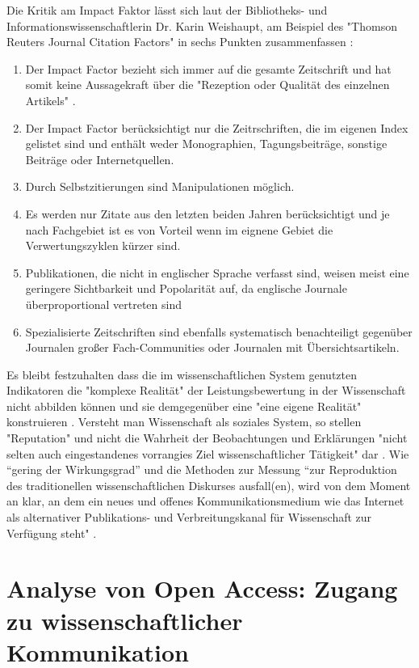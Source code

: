 Die Kritik am Impact Faktor lässt sich laut der Bibliotheks- und Informationswissenschaftlerin Dr. Karin Weishaupt, am Beispiel des "Thomson Reuters Journal Citation Factors" in sechs Punkten zusammenfassen \cite{weishaupt_2009_goldenOA}:
\begin{enumerate}
\item Der Impact Factor bezieht sich immer auf die gesamte Zeitschrift und hat somit keine Aussagekraft über die "Rezeption oder Qualität des einzelnen Artikels" .
\item Der Impact Factor berücksichtigt nur die Zeitrschriften, die im eigenen Index gelistet sind und enthält weder Monographien, Tagungsbeiträge, sonstige Beiträge oder Internetquellen.
\item Durch Selbstzitierungen sind Manipulationen möglich.
\item Es werden nur Zitate aus den letzten beiden Jahren berücksichtigt und je nach Fachgebiet ist es von Vorteil wenn im eignene Gebiet die Verwertungszyklen kürzer sind.
\item Publikationen, die nicht in englischer Sprache verfasst sind, weisen meist eine geringere Sichtbarkeit und Popolarität auf, da englische Journale überproportional vertreten sind
\item Spezialisierte Zeitschriften sind ebenfalls systematisch benachteiligt gegenüber Journalen großer Fach-Communities oder Journalen mit Übersichtsartikeln.
\end{enumerate}

Es bleibt festzuhalten dass die im wissenschaftlichen System genutzten Indikatoren die "komplexe Realität" der Leistungsbewertung in der Wissenschaft nicht abbilden können und sie demgegenüber eine "eine eigene Realität" konstruieren \cite{Hornbostel_1997}. Versteht man Wissenschaft als soziales System, so stellen "Reputation" und nicht die Wahrheit der Beobachtungen und Erklärungen "nicht selten auch eingestandenes vorrangies Ziel wissenschaftlicher Tätigkeit" dar \cite{luhmann_1970_selbststeuerung}. Wie “gering der Wirkungsgrad” und die Methoden zur Messung “zur Reproduktion des traditionellen wissenschaftlichen Diskurses ausfall(en), wird von dem Moment an klar, an dem ein neues und offenes Kommunikationsmedium wie das Internet als alternativer Publikations- und Verbreitungskanal für Wissenschaft zur Verfügung steht" \cite{Rost_1998}.

\section{Analyse von Open Access: Zugang zu wissenschaftlicher Kommunikation}

